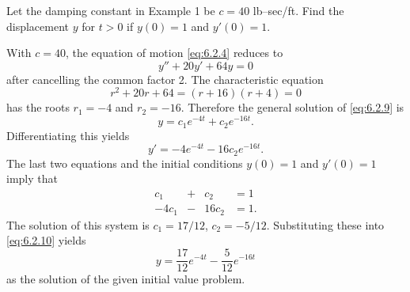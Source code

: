 \documentclass{ximera}
\begin{document}
\begin{example}\label{example:6.2.3}
Let the damping constant in Example 1 be $c=40$ lb--sec/ft. Find the
displacement $y$ for $t>0$ if $y(0)=1$ and $y'(0)=1$.
 
\begin{explanation}
With $c=40$, the equation of motion \eqref{eq:6.2.4} reduces to
\begin{equation}\label{eq:6.2.9}
y''+20y'+64y=0
\end{equation}
 after cancelling the  common factor 2.
The characteristic equation
$$
r^2+20r+64=(r+16)(r+4)=0
$$
 has the roots $r_1=-4$ and $r_2=-16$.  Therefore the general
solution of  \eqref{eq:6.2.9} is
\begin{equation}\label{eq:6.2.10}
y=c_1e^{-4t}+c_2e^{-16t}.
\end{equation}
 Differentiating this yields
$$
y'=-4e^{-4t}-16c_2e^{-16t}.
$$
The last two equations and the initial conditions $y(0)=1$ and $y'(0)=1$
imply that
$$
\begin{array}{rlrl}
c_1&+&c_2&=1\\
-4c_1&-&16c_2&=1.
\end{array}
$$
 The solution of this system is $c_1=17/12$, $c_2=-5/12$.
Substituting these into  \eqref{eq:6.2.10} yields
$$
y=\frac{17}{12}e^{-4t}-\frac{5}{12}e^{-16t}
$$
as the solution of the given initial value problem.

\begin{center}
\end{center}

 
 
\end{explanation}
\end{example}
 
\end{document}
